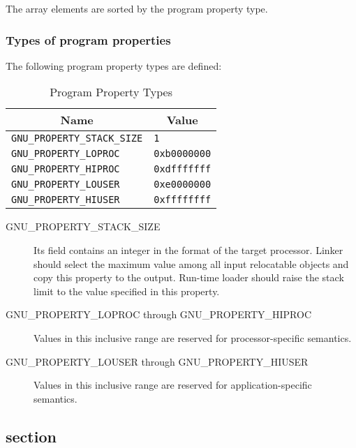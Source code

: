 The array elements are sorted by the program property type.

\subsubsection{Types of program properties}

The following program property types are defined:

\begin{table}[H]
\Hrule
  \caption{Program Property Types}
  \begin{center}
    \begin{tabular}[t]{l|l}
      \multicolumn{1}{c}{Name} & \multicolumn{1}{c}{Value} \\
      \hline
      \texttt{GNU_PROPERTY_STACK_SIZE} & \texttt{1} \\
      \texttt{GNU_PROPERTY_LOPROC} & \texttt{0xb0000000} \\
      \texttt{GNU_PROPERTY_HIPROC} & \texttt{0xdfffffff} \\
      \texttt{GNU_PROPERTY_LOUSER} & \texttt{0xe0000000} \\
      \texttt{GNU_PROPERTY_HIUSER} & \texttt{0xffffffff} \\
    \end{tabular}
  \end{center}
\Hrule
\end{table}

\begin{description}
 \item[GNU_PROPERTY_STACK_SIZE]
   Its  field contains an integer in the format of the
   target processor.  Linker should select the maximum value among all
   input relocatable objects and copy this property to the output.
   Run-time loader should raise the stack limit to the value specified
   in this property.
 \item[GNU_PROPERTY_LOPROC through GNU_PROPERTY_HIPROC]
   Values in this inclusive range are reserved for processor-specific
   semantics.
 \item[GNU_PROPERTY_LOUSER through GNU_PROPERTY_HIUSER]
   Values in this inclusive range are reserved for application-specific
   semantics.
\end{description}

\subsection{ section}
\label{sec_abi_tag}

